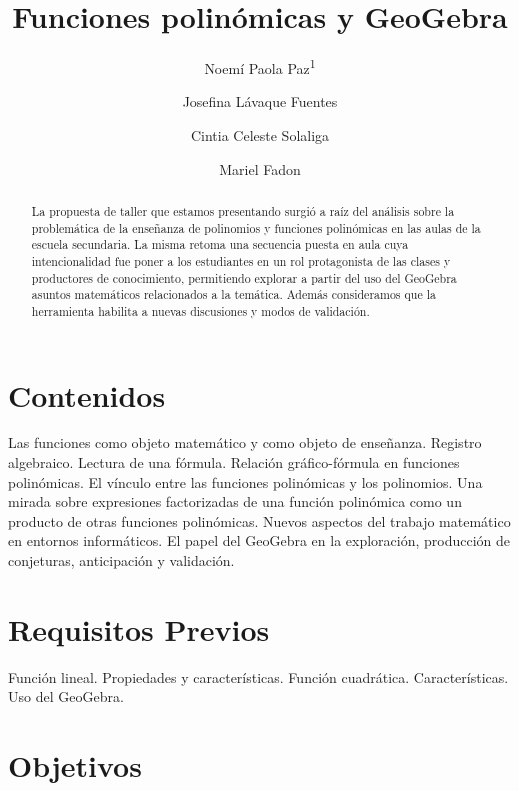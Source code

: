\documentclass[oneside,spanish]{amsart}
\numberwithin{equation}{section}
\numberwithin{figure}{section}
\theoremstyle{definition}
\begin{document}
	
\title{Funciones polinómicas y GeoGebra\vspace{-2ex}}
\author[1]{Noemí Paola Paz\textsuperscript{1}}
\author[2]{Josefina Lávaque Fuentes}
\author[3]{Cintia Celeste Solaliga}
\author[4]{Mariel Fadon}

\begin{abstract}
	  La propuesta de taller que estamos presentando surgió a raíz del análisis sobre la problemática de la enseñanza de polinomios y funciones polinómicas en las aulas de la escuela secundaria. La misma retoma una secuencia puesta en aula cuya intencionalidad fue poner a los estudiantes en un rol protagonista de las clases y productores de conocimiento, permitiendo explorar a partir del uso del GeoGebra asuntos matemáticos relacionados a la temática. Además consideramos que la herramienta habilita a nuevas discusiones y modos de validación.
\end{abstract}

\maketitle
\thispagestyle{empty}

\section{Contenidos}

Las funciones como objeto matemático y como objeto de enseñanza. Registro algebraico. Lectura de una fórmula. Relación gráfico-fórmula en funciones polinómicas. El vínculo entre las funciones polinómicas y los polinomios. Una mirada sobre expresiones factorizadas de una función polinómica como un producto de otras funciones polinómicas. Nuevos aspectos del trabajo matemático en entornos informáticos. El papel del GeoGebra en la exploración, producción de conjeturas, anticipación y validación.

\section{Requisitos Previos}

Función lineal. Propiedades y características. Función cuadrática. Características. Uso del GeoGebra.

\section{Objetivos}
\end{document}
